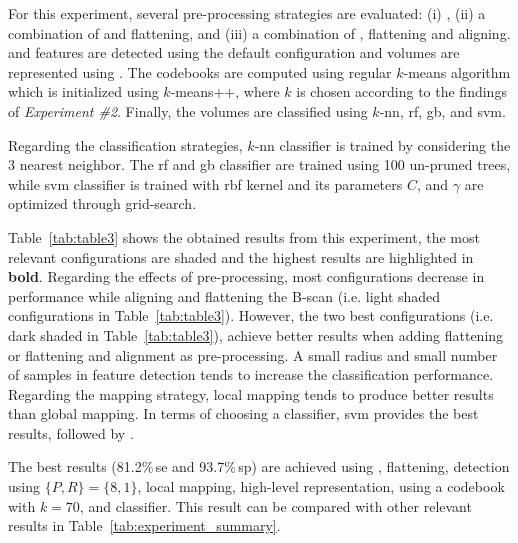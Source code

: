 For this experiment, several pre-processing strategies are evaluated: (i) \nlm, (ii) a combination of \nlm and flattening, and (iii) a combination of \nlm, flattening and aligning.
\lbp and \lbptop features are detected using the default configuration and volumes are represented using \bow.
The codebooks are computed using regular $k$-means algorithm which is initialized using $k$-means++, where $k$ is chosen according to the findings of \emph{Experiment \#2}.
Finally, the volumes are classified using $k$-\ac{nn}, \ac{rf}, \ac{gb}, and \ac{svm}.

Regarding the classification strategies, $k$-\ac{nn} classifier is trained by considering the 3 nearest neighbor.
The \ac{rf} and \ac{gb} classifier are trained using 100 un-pruned trees, while \ac{svm} classifier is trained with \ac{rbf} kernel and its parameters $C$, and $\gamma$ are optimized through grid-search.

Table~\ref{tab:table3} shows the obtained results from this experiment, the most relevant configurations are shaded and the highest results are highlighted in \textbf{bold}.
Regarding the effects of pre-processing, most configurations decrease in performance while aligning and flattening the B-scan (i.e. light shaded configurations in Table~\ref{tab:table3}).
However, the two best configurations (i.e. dark shaded in Table~\ref{tab:table3}), achieve better results when adding flattening or flattening and alignment as pre-processing.
A small radius and small number of samples in feature detection tends to increase the classification performance.
Regarding the mapping strategy, local mapping tends to produce better results than global mapping.
In terms of choosing a classifier, \ac{svm} provides the best results, followed by \rf.

The best results (81.2\%\,\ac{se} and 93.7\%\,\ac{sp}) are achieved using \nlm, flattening, \lbp detection using $\{P,R\} = \{8,1\}$, local mapping, high-level representation, using a codebook with $k=70$, and \svm classifier.
This result can be compared with other relevant results in Table~\ref{tab:experiment_summary}.

